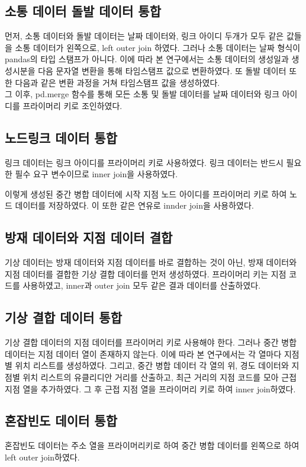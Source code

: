 \documentclass[11pt]{report}
\begin{document}
\subsection{소통 데이터 돌발 데이터 통합}
먼저, 소통 데이터와 돌발 데이터는 날짜 데이터와, 링크 아이디 두개가 모두 같은 값들을 소통 데이터가 왼쪽으로, left outer join 하였다. 
그러나 소통 데이터는 날짜 형식이 pandas의 타입 스탬프가 아니다. 
이에 따라 본 연구에서는 소통 데이터의 생성일과 생성시분을 다음 문자열 변환을 통해 타임스탬프 값으로 변환하였다. 
또 돌발 데이터 또한 다음과 같은 변환 과정을 거쳐 타임스탬프 값을 생성하였다. \\
\indent 그 이후, pd.merge 함수를 통해 모든 소통 및 돌발 데이터를 날짜 데이터와 링크 아이디를 프라이머리 키로 조인하였다. 

\subsection{노드링크 데이터 통합}
링크 데이터는 링크 아이디를 프라이머리 키로 사용하였다. 
링크 데이터는 반드시 필요한 필수 요구 변수이므로 inner join을 사용하였다. 

이렇게 생성된 중간 병합 데이터에 시작 지점 노드 아이디를 프라이머리 키로 하여 노드 데이터를 저장하였다. 
이 또한 같은 연유로 innder join을 사용하였다. 

\subsection{방재 데이터와 지점 데이터 결합}
기상 데이터는 방재 데이터와 지점 데이터를 바로 결합하는 것이 아닌, 방재 데이터와 지점 데이터를 결합한 기상 결합 데이터를 먼저 생성하였다. 
프라이머리 키는 지점 코드를 사용하였고, inner과 outer join 모두 같은 결과 데이터를 산출하였다.  

\subsection{기상 결합 데이터 통합}
기상 결합 데이터의 지점 데이터를 프라이머리 키로 사용해야 한다. 
그러나 중간 병합 데이터는 지점 데이터 열이 존재하지 않는다. 
이에 따라 본 연구에서는 각 열마다 지점별 위치 리스트를 생성하였다. 
그리고, 중간 병합 데이터 각 열의 위, 경도 데이터와 지점별 위치 리스트의 유클리디안 거리를 산출하고, 최근 거리의 지점 코드를 모아 근접 지점 열을 추가하였다. 
그 후 근접 지점 열을 프라이머리 키로 하여 inner join하였다. 

\subsection{혼잡빈도 데이터 통합}
혼잡빈도 데이터는 주소 열을 프라이머리키로 하여 중간 병합 데이터를 왼쪽으로 하여 left outer join하였다. 
\end{document}
